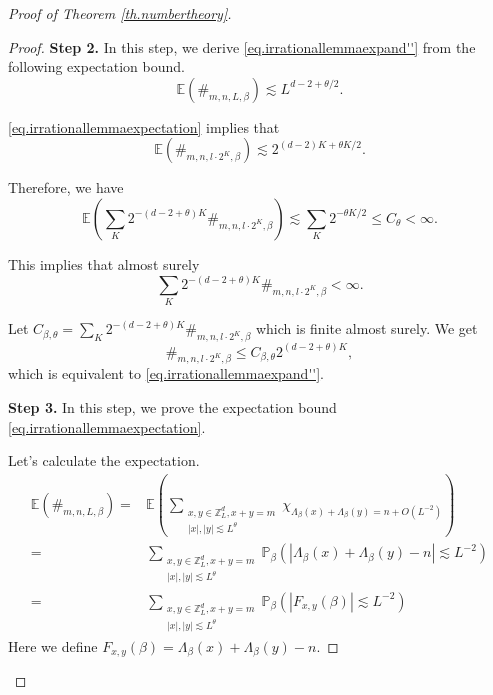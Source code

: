 \begin{proof}[Proof of Theorem \ref{th.numbertheory}]
\begin{proof}
\textbf{Step 2.} In this step, we derive \eqref{eq.irrationallemmaexpand''} from the following expectation bound.
\begin{equation}\label{eq.irrationallemmaexpectation}
    \mathbb{E}(\#_{m,n,L,\beta})\lesssim L^{d-2+\theta/2}.
\end{equation}

\eqref{eq.irrationallemmaexpectation} implies that
\begin{equation}\label{eq.irrationallemmaexpectation'}
    \mathbb{E}(\#_{m,n,l\cdot 2^K,\beta})\lesssim 2^{(d-2)K+\theta K/2}.
\end{equation}

Therefore, we have
\begin{equation}
    \mathbb{E}\left(\sum_{K} 2^{-(d-2+\theta)K}\#_{m,n,l\cdot 2^K,\beta}\right)\lesssim \sum_K 2^{-\theta K/2}\le C_{\theta}<\infty.
\end{equation}

This implies that almost surely
\begin{equation}
    \sum_{K} 2^{-(d-2+\theta)K}\#_{m,n,l\cdot 2^K,\beta}<\infty.
\end{equation}

Let $C_{\beta,\theta}=\sum_{K} 2^{-(d-2+\theta)K}\#_{m,n,l\cdot 2^K,\beta}$ which is finite almost surely. We get 
\begin{equation}
    \#_{m,n,l\cdot 2^K,\beta}\le C_{\beta,\theta} 2^{(d-2+\theta)K},
\end{equation}
which is equivalent to \eqref{eq.irrationallemmaexpand''}.

\textbf{Step 3.} In this step, we prove the expectation bound \eqref{eq.irrationallemmaexpectation}.

Let's calculate the expectation.
\begin{equation}\label{eq.irrationallemmastep2}
\begin{split}
    \mathbb{E}(\#_{m,n,L,\beta})=&\mathbb{E}\left(\sum_{\substack{x,y\in\mathbb{Z}^d_L,x+y=m \\ |x|,|y|\lesssim L^{\theta}}} \chi_{\Lambda_{\beta}(x)+\Lambda_{\beta}(y)=n+O(L^{-2})}\right)
    \\
    =&\sum_{\substack{x,y\in\mathbb{Z}^d_L,x+y=m \\ |x|,|y|\lesssim L^{\theta}}} \mathbb{P}_{\beta}(|\Lambda_{\beta}(x)+\Lambda_{\beta}(y)-n|\lesssim L^{-2})
    \\
    =&\sum_{\substack{x,y\in\mathbb{Z}^d_L,x+y=m \\ |x|,|y|\lesssim L^{\theta}}} \mathbb{P}_{\beta}(|F_{x,y}(\beta)|\lesssim L^{-2})
\end{split}
\end{equation}
Here we define $F_{x,y}(\beta)=\Lambda_{\beta}(x)+\Lambda_{\beta}(y)-n$.


\end{proof}
\end{proof}
